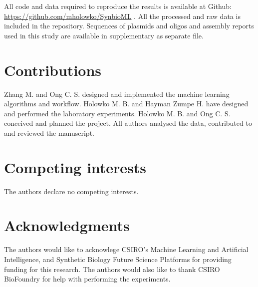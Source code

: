 \documentclass{article}
\begin{document}
All code and data required to reproduce the results is available at Github: \url{https://github.com/mholowko/SynbioML} .
All the processed and raw data is included in the repository.
Sequences of plasmids and oligos and assembly reports used in this study are available in supplementary as separate file.

\section*{Contributions}
Zhang M. and Ong C. S. designed and implemented the machine learning algorithms and workflow. Holowko M. B. and Hayman Zumpe H. have designed and performed the laboratory experiments. Holowko M. B. and Ong C. S. conceived and planned the project. All authors analysed the data, contributed to and reviewed the manuscript.

\section*{Competing interests}
The authors declare no competing interests.

\section*{Acknowledgments}
The authors would like to acknowlege CSIRO's Machine Learning and Artificial Intelligence, and Synthetic Biology Future Science Platforms for providing funding for this research. The authors would also like to thank CSIRO BioFoundry for help with performing the experiments.


\newpage

\printbibliography

\clearpage

\setcounter{figure}{0}
\makeatletter 
\renewcommand{\thefigure}{S\@arabic\c@figure}
\makeatother
\appendix

\end{document}
